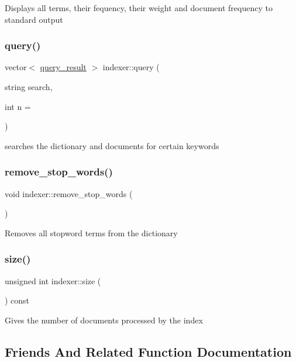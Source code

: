 Displays all terms, their fequency, their weight and document frequency to standard output \mbox{\label{classindexer_ae72394af5bf9eb84cf2b245f19d8cf27}} 
\subsubsection{\texorpdfstring{query()}{query()}}
{\footnotesize\ttfamily vector$<$ \hyperlink{classquery__result}{query\+\_\+result} $>$ indexer\+::query (\begin{DoxyParamCaption}\item[{string}]{search,  }\item[{int}]{n = {} }\end{DoxyParamCaption})}

searches the dictionary and documents for certain keywords \mbox{\label{classindexer_afdaec83c53cbc4df71436a4c936a2e89}} 
\subsubsection{\texorpdfstring{remove\+\_\+stop\+\_\+words()}{remove\_stop\_words()}}
{\footnotesize\ttfamily void indexer\+::remove\+\_\+stop\+\_\+words (\begin{DoxyParamCaption}{ }\end{DoxyParamCaption})}

Removes all stopword terms from the dictionary \mbox{\label{classindexer_a227b90870b8807668485754e402b8a60}} 
\subsubsection{\texorpdfstring{size()}{size()}}
{\footnotesize\ttfamily unsigned int indexer\+::size (\begin{DoxyParamCaption}{ }\end{DoxyParamCaption}) const}

Gives the number of documents processed by the index 

\subsection{Friends And Related Function Documentation}
\mbox{\label{classindexer_afbe836c0f0a47dc1393416275175fadb}} 
